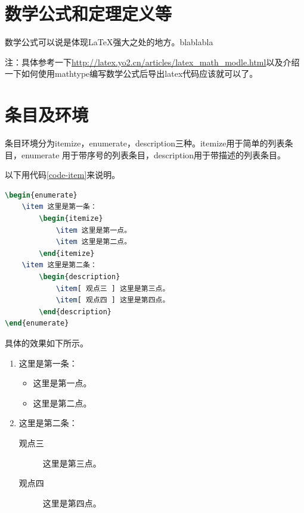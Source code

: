 \section{数学公式和定理定义等}
数学公式可以说是体现\LaTeX{}强大之处的地方。blablabla\par
注：具体参考一下\url{http://latex.yo2.cn/articles/latex_math_modle.html}以及介绍一下如何使用mathtype编写数学公式后导出latex代码应该就可以了。
\section{条目及环境}
条目环境分为itemize，enumerate，description三种。itemize用于简单的列表条目，enumerate
用于带序号的列表条目，description用于带描述的列表条目。\par
以下用代码\ref{code-item}来说明。
\begin{lstlisting}[label={code-item},caption={条目环境},language={LaTeX}]
\begin{enumerate}
    \item 这里是第一条：
        \begin{itemize}
            \item 这里是第一点。
            \item 这里是第二点。    
        \end{itemize}
    \item 这里是第二条：
        \begin{description}
            \item[ 观点三 ] 这里是第三点。
            \item[ 观点四 ] 这里是第四点。
        \end{description}
\end{enumerate}
\end{lstlisting}
具体的效果如下所示。\par
\begin{enumerate}
    \item 这里是第一条：
        \begin{itemize}
            \item 这里是第一点。
            \item 这里是第二点。
        \end{itemize}
    \item 这里是第二条：
        \begin{description}
            \item[观点三] 这里是第三点。
            \item[观点四] 这里是第四点。
        \end{description}
\end{enumerate}

